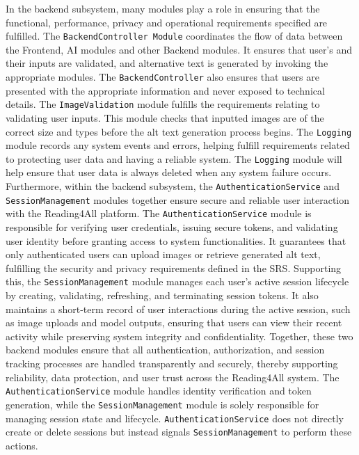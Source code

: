 \documentclass[12pt, titlepage]{article}
\begin{document}
In the backend subsystem, many modules play a role in ensuring that the functional,
performance, privacy and operational requirements specified are fulfilled. 
The \texttt{BackendController Module} coordinates the flow of data between the Frontend, AI modules and other Backend modules. It ensures that user's and their inputs are validated, and alternative text is generated by invoking the appropriate modules. 
The \texttt{BackendController} also ensures that users are presented with the appropriate information and never exposed to technical details. 
The \texttt{ImageValidation} module fulfills the requirements relating to validating user inputs. This module checks that inputted images are of the correct size and types before the alt text generation process begins. 
The \texttt{Logging} module records any system events and errors, helping fulfill requirements related to protecting user data and having a reliable system. The \texttt{Logging} module will help ensure that user data is always deleted when any system failure occurs. \\

Furthermore, within the backend subsystem, the \texttt{AuthenticationService} and \\\texttt{SessionManagement} modules together ensure secure and reliable user interaction with the Reading4All platform. 
The \texttt{AuthenticationService} module is responsible for verifying user credentials, issuing secure tokens, and validating user identity before granting access to system functionalities. 
It guarantees that only authenticated users can upload images or retrieve generated alt text, fulfilling the security and privacy requirements defined in the SRS. 
Supporting this, the \texttt{SessionManagement} module manages each user’s active session lifecycle by creating, validating, refreshing, and terminating session tokens. 
It also maintains a short-term record of user interactions during the active session, such as image uploads and model outputs, ensuring that users can view their recent activity while preserving system integrity and confidentiality. 
Together, these two backend modules ensure that all authentication, authorization, and session tracking processes are handled transparently and securely, thereby supporting reliability, data protection, and user trust across the Reading4All system. The \texttt{AuthenticationService} 
module handles identity verification and token generation, while the \texttt{SessionManagement} module is solely responsible for managing session state and lifecycle. \texttt{AuthenticationService} does not directly create or delete sessions 
but instead signals \texttt{SessionManagement} to perform these actions.
\end{document}
